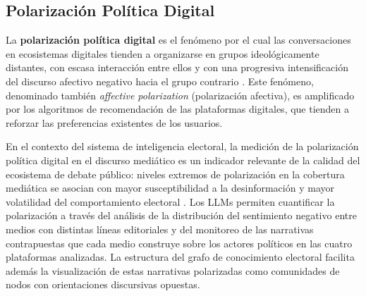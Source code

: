 \subsection{Polarización Política Digital}

La \textbf{polarización política digital} es el fenómeno por el cual las conversaciones en ecosistemas digitales tienden a organizarse en grupos ideológicamente distantes, con escasa interacción entre ellos y con una progresiva intensificación del discurso afectivo negativo hacia el grupo contrario \parencite{mc_iyengar2019origins}. Este fenómeno, denominado también \textit{affective polarization} (polarización afectiva), es amplificado por los algoritmos de recomendación de las plataformas digitales, que tienden a reforzar las preferencias existentes de los usuarios.

En el contexto del sistema de inteligencia electoral, la medición de la polarización política digital en el discurso mediático es un indicador relevante de la calidad del ecosistema de debate público: niveles extremos de polarización en la cobertura mediática se asocian con mayor susceptibilidad a la desinformación y mayor volatilidad del comportamiento electoral \parencite{mc_iyengar2019origins}. Los LLMs permiten cuantificar la polarización a través del análisis de la distribución del sentimiento negativo entre medios con distintas líneas editoriales y del monitoreo de las narrativas contrapuestas que cada medio construye sobre los actores políticos en las cuatro plataformas analizadas. La estructura del grafo de conocimiento electoral facilita además la visualización de estas narrativas polarizadas como comunidades de nodos con orientaciones discursivas opuestas.

